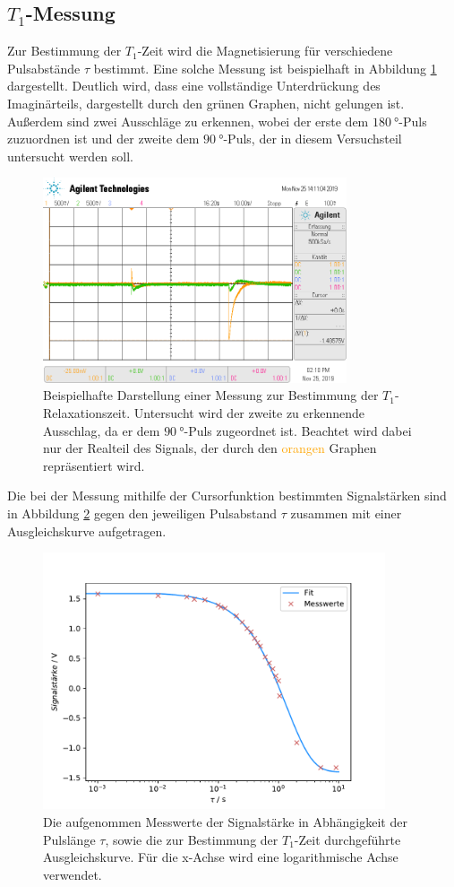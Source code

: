 \subsection{$T_1$-Messung}
Zur Bestimmung der $T_1$-Zeit wird die Magnetisierung für verschiedene Pulsabstände $\tau$ bestimmt.
Eine solche Messung ist beispielhaft in Abbildung \ref{fig:t1} dargestellt. Deutlich wird, dass eine vollständige Unterdrückung
des Imaginärteils, dargestellt durch den grünen Graphen, nicht gelungen ist. Außerdem sind zwei Ausschläge zu erkennen, wobei der
erste dem $\SI{180}{\degree}$-Puls zuzuordnen ist und der zweite dem $\SI{90}{\degree}$-Puls, der in diesem
Versuchsteil untersucht werden soll.
\begin{figure}[H]
  \centering
  \includegraphics[width=0.8\textwidth]{../data/T1.png}
  \caption{Beispielhafte Darstellung einer Messung zur Bestimmung der $T_1$-Relaxationszeit. Untersucht wird der zweite zu
  erkennende Ausschlag, da er dem $\SI{90}{\degree}$-Puls zugeordnet ist. Beachtet wird dabei nur der Realteil des Signals,
  der durch den \textcolor{orange}{orangen} Graphen repräsentiert wird.}
  \label{fig:t1}
\end{figure} \noindent
Die bei der Messung mithilfe der Cursorfunktion bestimmten Signalstärken sind in Abbildung \ref{fig:t1_fit} gegen den
jeweiligen Pulsabstand $\tau$ zusammen mit einer Ausgleichskurve aufgetragen.
\begin{figure}[H]
  \centering
  \includegraphics[width=0.9\textwidth]{../Auswertung/t1_fit.pdf}
  \caption{Die aufgenommen Messwerte der Signalstärke in Abhängigkeit der Pulslänge $\tau$, sowie die
  zur Bestimmung der $T_1$-Zeit durchgeführte Ausgleichskurve. Für die x-Achse wird eine
  logarithmische Achse verwendet.}
  \label{fig:t1_fit}
\end{figure}

